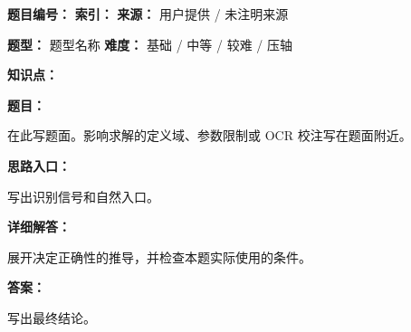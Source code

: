 
\begin{problemBox}
\begin{problemMeta}
\textbf{题目编号：}  \quad
\textbf{索引：}  \quad
\textbf{来源：} 用户提供 / 未注明来源

\textbf{题型：} 题型名称 \quad
\textbf{难度：} 基础 / 中等 / 较难 / 压轴

\textbf{知识点：} 
\end{problemMeta}

\textbf{题目：}

在此写题面。影响求解的定义域、参数限制或 OCR 校注写在题面附近。
\end{problemBox}

\begin{solutionBox}
\textbf{思路入口：}

写出识别信号和自然入口。

\textbf{详细解答：}

展开决定正确性的推导，并检查本题实际使用的条件。

\textbf{答案：}

写出最终结论。
\end{solutionBox}
